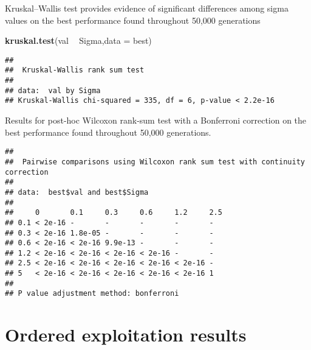 \documentclass[]{book}
\newenvironment{Shaded}{\begin{snugshade}}{\end{snugshade}}
\newcommand{\DataTypeTok}[1]{\textcolor[rgb]{0.13,0.29,0.53}{#1}}
\newcommand{\KeywordTok}[1]{\textcolor[rgb]{0.13,0.29,0.53}{\textbf{#1}}}
\newcommand{\NormalTok}[1]{#1}
\newcommand{\OperatorTok}[1]{\textcolor[rgb]{0.81,0.36,0.00}{\textbf{#1}}}
\newcommand{\OtherTok}[1]{\textcolor[rgb]{0.56,0.35,0.01}{#1}}
\newcommand{\StringTok}[1]{\textcolor[rgb]{0.31,0.60,0.02}{#1}}
\begin{document}
Kruskal--Wallis test provides evidence of significant differences among sigma values on the best performance found throughout 50,000 generations

\begin{Shaded}
\begin{Highlighting}[]
\KeywordTok{kruskal.test}\NormalTok{(val }\OperatorTok{~}\StringTok{ }\NormalTok{Sigma,}\DataTypeTok{data =}\NormalTok{ best)}
\end{Highlighting}
\end{Shaded}

\begin{verbatim}
## 
##  Kruskal-Wallis rank sum test
## 
## data:  val by Sigma
## Kruskal-Wallis chi-squared = 335, df = 6, p-value < 2.2e-16
\end{verbatim}

Results for post-hoc Wilcoxon rank-sum test with a Bonferroni correction on the best performance found throughout 50,000 generations.

\begin{Shaded}
\end{Shaded}

\begin{verbatim}
## 
##  Pairwise comparisons using Wilcoxon rank sum test with continuity correction 
## 
## data:  best$val and best$Sigma 
## 
##     0       0.1     0.3     0.6     1.2     2.5
## 0.1 < 2e-16 -       -       -       -       -  
## 0.3 < 2e-16 1.8e-05 -       -       -       -  
## 0.6 < 2e-16 < 2e-16 9.9e-13 -       -       -  
## 1.2 < 2e-16 < 2e-16 < 2e-16 < 2e-16 -       -  
## 2.5 < 2e-16 < 2e-16 < 2e-16 < 2e-16 < 2e-16 -  
## 5   < 2e-16 < 2e-16 < 2e-16 < 2e-16 < 2e-16 1  
## 
## P value adjustment method: bonferroni
\end{verbatim}

\hypertarget{ordered-exploitation-results-4}{%
\section{Ordered exploitation results}\label{ordered-exploitation-results-4}}
\end{document}

